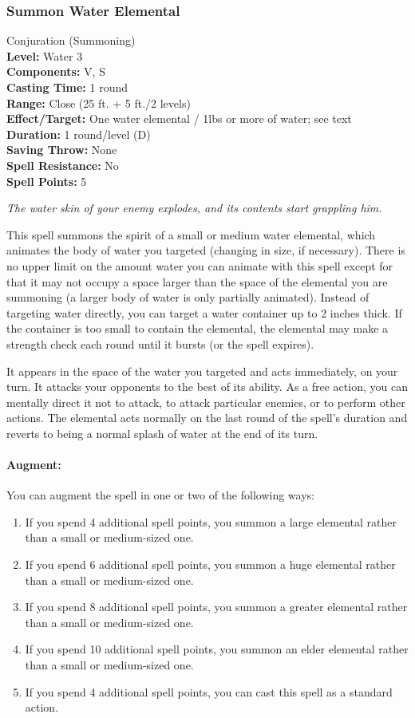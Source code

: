 \subsubsection{Summon Water Elemental}
\label{Spell:SummonWaterElemental}
Conjuration (Summoning)
\\ \textbf{Level:} Water 3
\\ \textbf{Components:} V, S
\\ \textbf{Casting Time:} 1 round
\\ \textbf{Range:} Close (25 ft. + 5 ft./2 levels)
\\ \textbf{Effect/Target:} One water elemental / 1lbs or more of water; see text
\\ \textbf{Duration:} 1 round/level (D)
\\ \textbf{Saving Throw:} None
\\ \textbf{Spell Resistance:} No
\\ \textbf{Spell Points:} 5

\emph{The water skin of your enemy explodes, and its contents start grappling him.}

This spell summons the spirit of a small or medium water elemental, which animates the body of water you targeted (changing in size, if necessary). There is no upper limit on the amount water you can animate with this spell except for that it may not occupy a space larger than the space of the elemental you are summoning (a larger body of water is only partially animated).
Instead of targeting water directly, you can target a water container up to 2 inches thick. If the container is too small to contain the elemental, the elemental may make a strength check each round until it bursts (or the spell expires).

It appears in the space of the water you targeted and acts immediately, on your turn.
It attacks your opponents to the best of its ability. 
As a free action, you can mentally direct it not to attack, to attack particular enemies, or to perform other actions. 
The elemental acts normally on the last round of the spell's duration and reverts to being a normal splash of water at the end of its turn.

\paragraph{Augment:} You can augment the spell in one or two of the following ways: 
\begin{enumerate}
 \item If you spend 4 additional spell points, you summon a large elemental rather than a small or medium-sized one.
 \item If you spend 6 additional spell points, you summon a huge elemental rather than a small or medium-sized one.
 \item If you spend 8 additional spell points, you summon a greater elemental rather than a small or medium-sized one.
 \item If you spend 10 additional spell points, you summon an elder elemental rather than a small or medium-sized one.
 \item If you spend 4 additional spell points, you can cast this spell as a standard action.
\end{enumerate}

